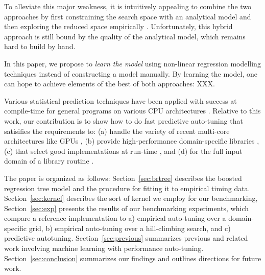 \documentclass{sig-alternate}
\begin{document}

To alleviate this major weakness, it is intuitively appealing to combine the two
approaches by first constraining the search space with an analytical model and
then exploring the reduced space empirically \citep{chen2005combining,
li2009note}. Unfortunately, this hybrid approach is still bound by the quality
of the analytical model, which remains hard to build by hand.


In this paper, we propose to \emph{learn the model} using non-linear regression
modelling techniques instead of constructing a model manually. By learning the model, one can
hope to achieve elements of the best of both approaches: XXX.

Various statistical prediction techniques have been applied with
success at compile-time for general programs on various CPU architectures
\citep{monsifrot2002machine, stephenson2003meta, yotov2003comparison,
kulkarni2004fast, cooper2005acme, franke2005probabilistic,
hutter2006performance, cavazos2007rapidly, cavazos2008intelligent,
hartono2009annotation, park2011evaluation, fursin2008milepost}.
Relative to this work, our contribution is to show
how to do fast predictive auto-tuning that satisifies the requirements to:
(a) handle the variety of recent multi-core architectures like GPUs \citep{schaa2009exploring},
(b) provide high-performance domain-specific libraries \citep{nukada2009auto, li2009note, kamil2010auto},
(c) that select good implementations at run-time \citep{klockner2011pycuda, pinto+cox:2011gcg}, and
(d) for the full input domain of a library routine \citep{liu2009cross, grauer2011optimizing}.

The paper is organized as follows:
Section~\ref{sec:brtree} describes the boosted regression tree model and the procedure for fitting it to empirical timing data.
Section~\ref{sec:kernel} describes the sort of kernel we employ for our benchmarking,
Section~\ref{sec:exp} presents the results of our benchmarking experiments, which
compare a reference implementation to a) empirical auto-tuning over a domain-specific grid,
b) empirical auto-tuning over a hill-climbing search, and
c) predictive autotuning.
Section~\ref{sec:previous} summarizes previous and related work involving  machine learning with performance auto-tuning.
Section~\ref{sec:conclusion} summarizes our findings and outlines directions for future work.
\end{document}
